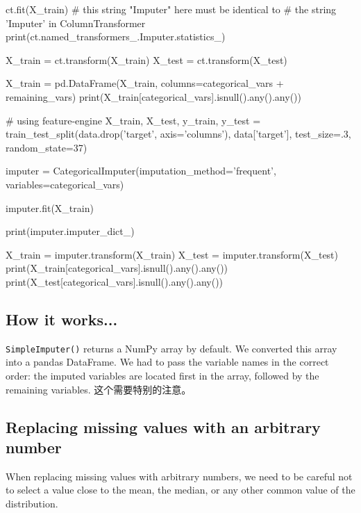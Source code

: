 \begin{pyc}
ct.fit(X_train)
# this string "Imputer" here must be identical to 
# the string 'Imputer' in ColumnTransformer
print(ct.named_transformers_.Imputer.statistics_)

X_train = ct.transform(X_train)
X_test = ct.transform(X_test)

X_train = pd.DataFrame(X_train, columns=categorical_vars + remaining_vars)
print(X_train[categorical_vars].isnull().any().any())

# using feature-engine
X_train, X_test, y_train, y_test = train_test_split(data.drop('target',
                                                                axis='columns'),
                                                    data['target'],
                                                    test_size=.3,
                                                    random_state=37)

imputer = CategoricalImputer(imputation_method='frequent', variables=categorical_vars)

imputer.fit(X_train)

print(imputer.imputer_dict_)

X_train = imputer.transform(X_train)
X_test = imputer.transform(X_test)
print(X_train[categorical_vars].isnull().any().any())
print(X_test[categorical_vars].isnull().any().any())
\end{pyc}
\subsection{How it works...}
\verb|SimpleImputer()| returns a NumPy array by default. We converted this array into a pandas
DataFrame. We had to pass the variable names in the correct order: the imputed variables are located
first in the array, followed by the remaining variables. 这个需要特别的注意。


\subsection{Replacing missing values with an arbitrary number}

When replacing missing values with arbitrary numbers, we need to be careful not to select a value
close to the mean, the median, or any other common value of the distribution.

